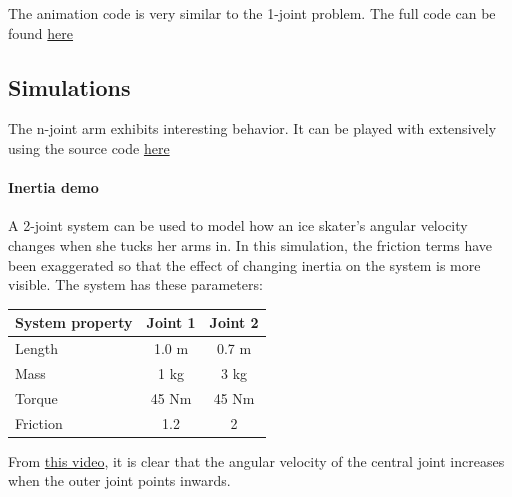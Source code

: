 \documentclass{article}
\begin{document}
\vspace{24pt}

The animation code is very similar to the 1-joint problem. The full code can be found \textcolor{blue}{\href{https://github.com/natebechard/Robotic-Arm-Simulation-From-First-Principles/blob/main/n_joints_constant_torque.py}{here}}

\subsection{Simulations}
The n-joint arm exhibits interesting behavior. It can be played with extensively using the source code \textcolor{blue}{\href{https://github.com/natebechard/Robotic-Arm-Simulation-From-First-Principles/blob/main/n_joints_constant_torque.py}{here}}

\paragraph{Inertia demo}
A 2-joint system can be used to model how an ice skater's angular velocity changes when she tucks her arms in. In this simulation, the friction terms have been exaggerated so that the effect of changing inertia on the system is more visible. The system has these parameters:

\vspace{14pt}

\centering
\begin{tabular}{|l|c|c|}
\hline
System property & Joint 1 & Joint 2\\
\hline
Length & 1.0 m & 0.7 m\\
Mass & 1 kg & 3 kg\\
Torque & 45 Nm & 45 Nm \\
Friction & 1.2 & 2 \\
\hline
\end{tabular}
\label{tab:quantities}

\vspace{14pt}

From \textcolor{green}{\href{https://github.com/natebechard/Robotic-Arm-Simulation-From-First-Principles/blob/main/inertia_demo.mp4}{this video}}, it is clear that the angular velocity of the central joint increases when the outer joint points inwards. 


\newpage
\end{document}
